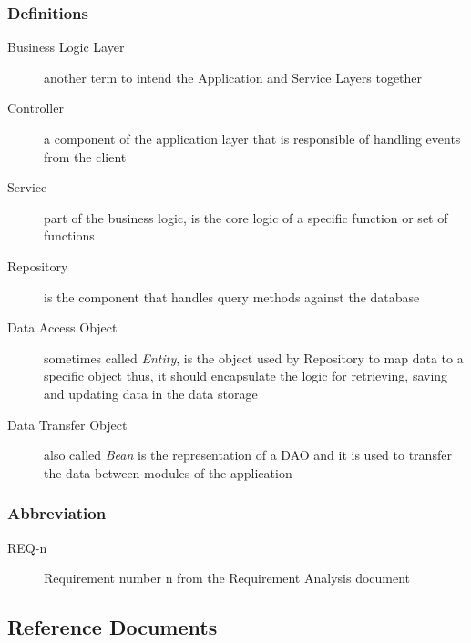 \documentclass[a4paper]{article}
\begin{document}
            \subsubsection{Definitions}
            \begin{description}
                 \item[Business Logic Layer] another term to intend the Application and Service Layers together
                 \item[Controller] a component of the application layer that is responsible of handling events from the client
                 \item[Service] part of the business logic, is the core logic of a specific function or set of functions
                 \item[Repository] is the component that handles query methods against the database
                 \item[Data Access Object] sometimes called \textit{Entity}, is the object used by Repository to map data to a specific object thus, it should encapsulate the logic for retrieving, saving and updating data in the data storage
                 \item[Data Transfer Object] also called \textit{Bean} is the representation of a DAO and it is used to transfer the data between modules of the application
            \end{description}
            
            \subsubsection{Abbreviation}
            \begin{description}
                \item[REQ-n] Requirement number n from the Requirement Analysis document
            \end{description}
            
\subsection{Reference Documents}
\printbibliography[heading=none]

\end{document}

